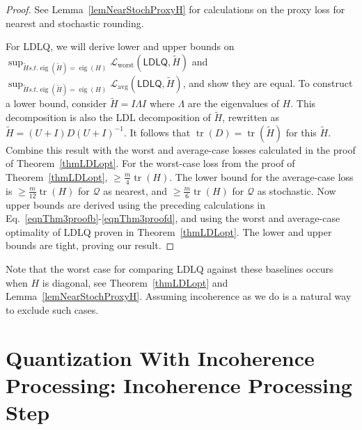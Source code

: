 \begin{proof}
See Lemma~\ref{lemNearStochProxyH} for calculations on the proxy loss for nearest and stochastic rounding.

For LDLQ, we will derive lower and upper bounds on $\sup_{\tilde H s.t. \operatorname{eig}(\tilde H) = \operatorname{eig}(H)} \mathcal{L}_{\operatorname{worst}}(\mathsf{LDLQ}, \tilde H)$ and $\sup_{\tilde H s.t. \operatorname{eig}(\tilde H) = \operatorname{eig}(H)} \mathcal{L}_{\operatorname{avg}}(\mathsf{LDLQ}, \tilde H)$, and show they are equal. To construct a lower bound, consider $\tilde H = I \Lambda I$ where $\Lambda$ are the eigenvalues of $H$. This decomposition is also the LDL decomposition of $\tilde H$, rewritten as $\tilde H=(U + I) D (U + I)^{-1}$. It follows that $\operatorname{tr}\left( D \right) = \operatorname{tr}\left( \tilde H \right)$ for this $\tilde H$. Combine this result with the worst and average-case losses calculated in the proof of Theorem~\ref{thmLDLopt}.
For the worst-case loss from the proof of Theorem~\ref{thmLDLopt}, $\geq \frac m4 \operatorname{tr}\left(H\right)$.
The lower bound for the average-case loss is $\geq \frac{m}{12} \operatorname{tr}\left(H\right)$ for $\mathcal{Q}$ as nearest, and $\geq \frac m6 \operatorname{tr}\left(H\right)$ for $\mathcal{Q}$ as stochastic. Now upper bounds are derived using the preceding calculations in Eq.~\eqref{eqnThm3proofb}-\eqref{eqnThm3proofd}, and using the worst and average-case optimality of LDLQ proven in Theorem~\ref{thmLDLopt}.
The lower and upper bounds are tight, proving our result.
\end{proof}

Note that the worst case for comparing LDLQ against these baselines occurs when $H$ is diagonal, see Theorem~\ref{thmLDLopt} and Lemma~\ref{lemNearStochProxyH}.
Assuming incoherence as we do is a natural way to exclude such cases.

\section{Quantization With Incoherence Processing: Incoherence Processing Step }

